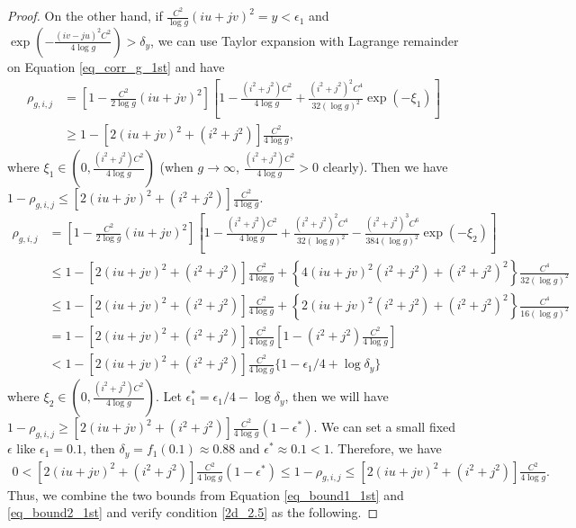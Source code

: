 \documentclass{article}
\begin{document}
\begin{appendices}
\begin{proof}
		On the other hand, if $\frac{C^2}{\log g}(iu+jv)^2=y<\epsilon_1$ and  $\exp(-\frac{(iv-ju)^2C^2}{4\log g})>\delta_y$, we can use Taylor expansion with Lagrange remainder on Equation \eqref{eq_corr_g_1st} and have
		\begin{equation*}
			\begin{aligned}
				\rho_{g,i,j}&= [1-\frac{C^2}{2\log g}(iu+jv)^2][1-\frac{(i^2+j^2)C^2}{4\log g}+\frac{(i^2+j^2)^2C^4}{32(\log g)^2}\exp(-\xi_1)]\\
				&\geq 1- [2(iu+jv)^2+(i^2+j^2)]\frac{C^2}{4\log g},
			\end{aligned}
		\end{equation*}
		where $\xi_1\in(0,\frac{(i^2+j^2)C^2}{4\log g})$ (when $g\rightarrow\infty$, $\frac{(i^2+j^2)C^2}{4\log g}>0$ clearly). Then we have $1-\rho_{g,i,j}\leq[2(iu+jv)^2+(i^2+j^2)]\frac{C^2}{4\log g}$. 
		\begin{equation*}
			\begin{aligned}
				\rho_{g,i,j}&= [1-\frac{C^2}{2\log g}(iu+jv)^2][1-\frac{(i^2+j^2)C^2}{4\log g}+\frac{(i^2+j^2)^2C^4}{32(\log g)^2}-\frac{(i^2+j^2)^3C^6}{384(\log g)^2}\exp(-\xi_2)]\\
				&\leq 1-[2(iu+jv)^2+(i^2+j^2)]\frac{C^2}{4\log g}+\left\{4(iu+jv)^2(i^2+j^2)+(i^2+j^2)^2\right\}\frac{C^4}{32(\log g)^2}\\
				&\leq 1-[2(iu+jv)^2+(i^2+j^2)]\frac{C^2}{4\log g}+\left\{2(iu+jv)^2(i^2+j^2)+(i^2+j^2)^2\right\}\frac{C^4}{16(\log g)^2}\\
				&=1-[2(iu+jv)^2+(i^2+j^2)]\frac{C^2}{4\log g}[1-(i^2+j^2)\frac{C^2}{4\log g}]\\
				&<1-[2(iu+jv)^2+(i^2+j^2)]\frac{C^2}{4\log g}\{1-\epsilon_1/4+\log \delta_y\}
			\end{aligned}
		\end{equation*}
		where $\xi_2\in(0,\frac{(i^2+j^2)C^2}{4\log g})$. Let $\epsilon^*_1=\epsilon_1/4-\log \delta_y$, then we will have $1-\rho_{g,i,j}\geq[2(iu+jv)^2+(i^2+j^2)]\frac{C^2}{4\log g}(1-\epsilon^*)$. We can set a small fixed $\epsilon$ like  $\epsilon_1=0.1$, then $\delta_y=f_1(0.1)\approx0.88$ and  $\epsilon^*\approx0.1<1$. Therefore, we have 
		\begin{equation}
			\label{eq_bound2_1st}
			\begin{aligned}
				0<[2(iu+jv)^2+(i^2+j^2)]\frac{C^2}{4\log g}(1-\epsilon^*)\leq1-\rho_{g,i,j}\leq[2(iu+jv)^2+(i^2+j^2)]\frac{C^2}{4\log g}.
			\end{aligned}
		\end{equation}
		Thus, we combine the two bounds from Equation \eqref{eq_bound1_1st} and \eqref{eq_bound2_1st} and verify condition \ref{2d_2.5} as the following.

\end{proof}
\end{appendices}
\end{document}
